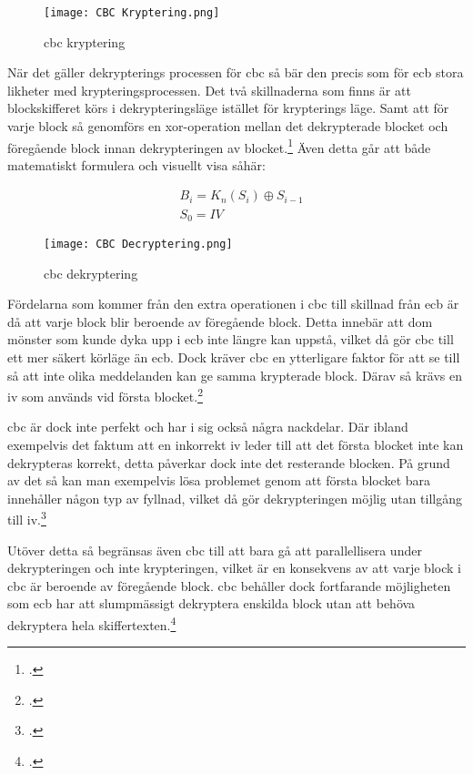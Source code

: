 \begin{figure}[H]
    \texttt{[image: CBC Kryptering.png]}
    \caption{\acrlong{cbc} kryptering}
    \label{fig:cbc-mode-enc}
\end{figure}

När det gäller dekrypterings processen för \acrshort{cbc} så bär den precis som för
\acrshort{ecb} stora likheter med krypteringsprocessen. Det två skillnaderna som
finns är att blockskifferet körs i dekrypteringsläge istället för krypterings läge.
Samt att för varje block så genomförs en \gls{xor}-operation mellan det dekrypterade
blocket och föregående block innan dekrypteringen av blocket.\footcite{dworkin2001sp}
Även detta går att både matematiskt formulera och visuellt visa såhär:

\begin{equation}
    \label{eq:cbc-decryption}
    \begin{aligned}
        &B_i = K_n(S_i) \oplus S_{i-1}\\\nonumber
        &S_0 = IV
    \end{aligned}
\end{equation}

\begin{figure}[H]
    \texttt{[image: CBC Decryptering.png]}
    \caption{\acrlong{cbc} dekryptering}
    \label{fig:cbc-mode-dec}
\end{figure}

Fördelarna som kommer från den extra operationen i \acrshort{cbc} till skillnad
från \acrshort{ecb} är då att varje block blir beroende av föregående block.
Detta innebär att dom mönster som kunde dyka upp i \acrshort{ecb} inte längre
kan uppstå, vilket då gör \acrshort{cbc} till ett mer säkert körläge än \acrshort{ecb}.
Dock kräver \acrshort{cbc} en ytterligare faktor för att se till så att inte olika meddelanden
kan ge samma krypterade block. Därav så krävs en \acrfull{iv} som används vid första
blocket.\footcite{dworkin2001sp}

\acrshort{cbc} är dock inte perfekt och har i sig också några nackdelar. Där ibland
exempelvis det faktum att en inkorrekt \acrshort{iv} leder till att det första blocket
inte kan dekrypteras korrekt, detta påverkar dock inte det resterande blocken. På grund
av det så kan man exempelvis lösa problemet genom att första blocket bara innehåller
någon typ av fyllnad, vilket då gör dekrypteringen möjlig utan tillgång till \acrshort{iv}.\footcite{dworkin2001sp}

Utöver detta så begränsas även \acrshort{cbc} till att bara gå att parallellisera under
dekrypteringen och inte krypteringen, vilket är en konsekvens av att varje block i \acrshort{cbc}
är beroende av föregående block. \acrshort{cbc} behåller dock fortfarande möjligheten
som \acrshort{ecb} har att slumpmässigt dekryptera enskilda block utan att behöva
dekryptera hela skiffertexten.\footcite{dworkin2001sp}

